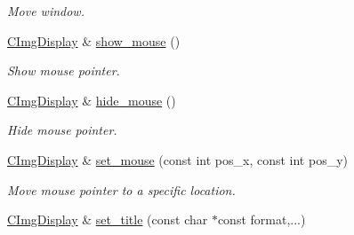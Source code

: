 \begin{DoxyCompactItemize}
\begin{DoxyCompactList}\small\item\em Move window. \item\end{DoxyCompactList}\item 
\hypertarget{structcimg__library_1_1CImgDisplay_a9fc997c0451ce75666f1bdfe45eb0343}{
\hyperlink{structcimg__library_1_1CImgDisplay}{CImgDisplay} \& \hyperlink{structcimg__library_1_1CImgDisplay_a9fc997c0451ce75666f1bdfe45eb0343}{show\_\-mouse} ()}
\label{structcimg__library_1_1CImgDisplay_a9fc997c0451ce75666f1bdfe45eb0343}

\begin{DoxyCompactList}\small\item\em Show mouse pointer. \item\end{DoxyCompactList}\item 
\hypertarget{structcimg__library_1_1CImgDisplay_a3fb8cda1473f326934c286e6e5d825e2}{
\hyperlink{structcimg__library_1_1CImgDisplay}{CImgDisplay} \& \hyperlink{structcimg__library_1_1CImgDisplay_a3fb8cda1473f326934c286e6e5d825e2}{hide\_\-mouse} ()}
\label{structcimg__library_1_1CImgDisplay_a3fb8cda1473f326934c286e6e5d825e2}

\begin{DoxyCompactList}\small\item\em Hide mouse pointer. \item\end{DoxyCompactList}\item 
\hypertarget{structcimg__library_1_1CImgDisplay_af089ae3b38f20ac0f5a450dc5ad215f1}{
\hyperlink{structcimg__library_1_1CImgDisplay}{CImgDisplay} \& \hyperlink{structcimg__library_1_1CImgDisplay_af089ae3b38f20ac0f5a450dc5ad215f1}{set\_\-mouse} (const int pos\_\-x, const int pos\_\-y)}
\label{structcimg__library_1_1CImgDisplay_af089ae3b38f20ac0f5a450dc5ad215f1}

\begin{DoxyCompactList}\small\item\em Move mouse pointer to a specific location. \item\end{DoxyCompactList}\item 
\hypertarget{structcimg__library_1_1CImgDisplay_afde9a27e1bb7d0ef822a0f0613f99d32}{
\hyperlink{structcimg__library_1_1CImgDisplay}{CImgDisplay} \& \hyperlink{structcimg__library_1_1CImgDisplay_afde9a27e1bb7d0ef822a0f0613f99d32}{set\_\-title} (const char $\ast$const format,...)}
\label{structcimg__library_1_1CImgDisplay_afde9a27e1bb7d0ef822a0f0613f99d32}


\end{DoxyCompactItemize}
